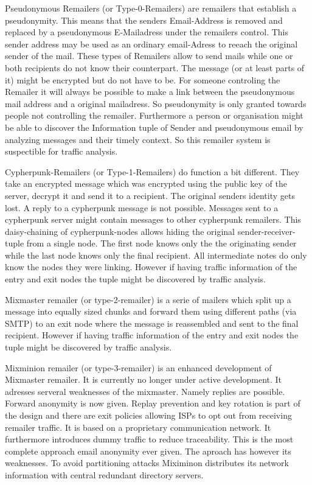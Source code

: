 Pseudonymous Remailers (or Type-0-Remailers) are remailers that establish a pseudonymity. This means that the senders Email-Address is removed and replaced by a pseudonymous E-Mailadress under the remailers control. This sender address may be used as an ordinary email-Adress to reeach the original sender of the mail. These types of Remailers allow to send mails while one or both recipients do not know their counterpart. The message (or at least parts of it) might be encrypted but do not have to be. For someone controling the Remailer it will always be possible to make a link between the pseudonymous mail address and a original mailadress. So pseudonymity is only granted towards people not controlling the remailer. Furthermore a person or organisation might be able to discover the Information tuple of Sender and pseudonymous email by analyzing messages and their timely context. So this remailer system is suspectible for traffic analysis.\par

Cypherpunk-Remailers (or Type-1-Remailers) do function a bit different. They take an encrypted message which was encrypted using the public key of the server, decrypt it and send it to a recipient. The original senders identity gets lost. A reply to a cypherpunk message is not possible. Messages sent to a cypherpunk server might contain messages to other cypherpunk remailers. This daisy-chaining of cypherpunk-nodes allows hiding the original sender-receiver-tuple from a single node. The first node knows only the the originating sender while the last node knows only the final recipient. All intermediate notes do only know the nodes they were linking. However if having traffic information of the entry and exit nodes the tuple might be discovered by traffic analysis.\par

Mixmaster remailer (or type-2-remailer) is a serie of mailers which split up a message into equally sized chunks and forward them using different paths (via SMTP) to an exit node where the message is reassembled and sent to the final recipient. However if having traffic information of the entry and exit nodes the tuple might be discovered by traffic analysis.\par

Mixminion remailer (or type-3-remailer) is an enhanced development of Mixmaster remailer. It is currently no longer under active development. It adresses serveral weaknesses of the mixmaster. Namely replies are possible. Forward anonymity is now given. Replay prevention and key rotation is part of the design and there are exit policies allowing ISPs to opt out from receiving remailer traffic. It is based on a proprietary communication network. It furthermore introduces dummy traffic to reduce traceability. This is the most complete approach email anonymity ever given. The aproach has however its weaknesses. To avoid partitioning attacks Miximinon distributes its network information with central redundant directory servers.\par

